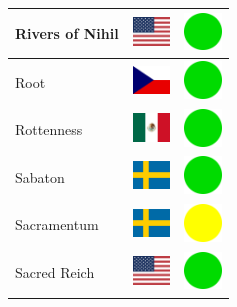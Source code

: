 \documentclass[12pt, a4paper, twoside]{report}
\begin{document}
\begin{center}
\begin{longtable}{|p{5cm}|p{2cm}|p{2cm}|}
Rivers of Nihil & \includegraphics[width=1cm]{4x3/us} & \includegraphics[width=1cm]{likes/y} \\ \hline
Root & \includegraphics[width=1cm]{4x3/cz} & \includegraphics[width=1cm]{likes/y} \\ \hline
Rottenness & \includegraphics[width=1cm]{4x3/mx} & \includegraphics[width=1cm]{likes/y} \\ \hline
Sabaton & \includegraphics[width=1cm]{4x3/se} & \includegraphics[width=1cm]{likes/y} \\ \hline
Sacramentum﻿ & \includegraphics[width=1cm]{4x3/se} & \includegraphics[width=1cm]{likes/m} \\ \hline
Sacred Reich & \includegraphics[width=1cm]{4x3/us} & \includegraphics[width=1cm]{likes/y} \\ \hline

\end{longtable}
\end{center}
\end{document}
